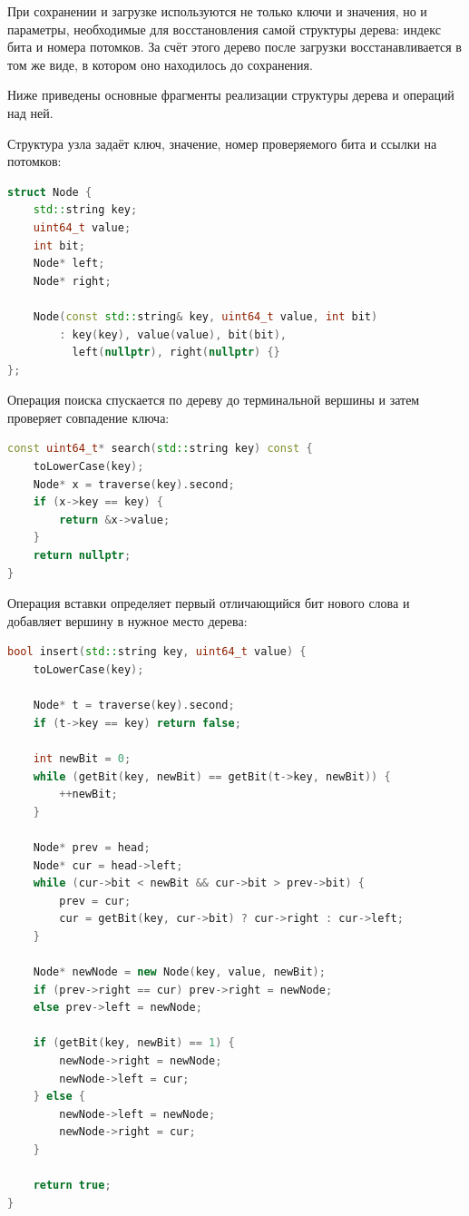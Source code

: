 При сохранении и загрузке используются не только ключи и значения, но и параметры, необходимые для восстановления самой структуры дерева: индекс бита и номера потомков. За счёт этого дерево после загрузки восстанавливается в том же виде, в котором оно находилось до сохранения.

Ниже приведены основные фрагменты реализации структуры дерева и операций над ней.

Структура узла задаёт ключ, значение, номер проверяемого бита и ссылки на потомков:

\begin{lstlisting}[language=C++]
struct Node {
    std::string key;
    uint64_t value;
    int bit;
    Node* left;
    Node* right;

    Node(const std::string& key, uint64_t value, int bit)
        : key(key), value(value), bit(bit),
          left(nullptr), right(nullptr) {}
};
\end{lstlisting}

Операция поиска спускается по дереву до терминальной вершины и затем проверяет совпадение ключа:

\begin{lstlisting}[language=C++]
const uint64_t* search(std::string key) const {
    toLowerCase(key);
    Node* x = traverse(key).second;
    if (x->key == key) {
        return &x->value;
    }
    return nullptr;
}
\end{lstlisting}

Операция вставки определяет первый отличающийся бит нового слова и добавляет вершину в нужное место дерева:

\begin{lstlisting}[language=C++]
bool insert(std::string key, uint64_t value) {
    toLowerCase(key);

    Node* t = traverse(key).second;
    if (t->key == key) return false;

    int newBit = 0;
    while (getBit(key, newBit) == getBit(t->key, newBit)) {
        ++newBit;
    }

    Node* prev = head;
    Node* cur = head->left;
    while (cur->bit < newBit && cur->bit > prev->bit) {
        prev = cur;
        cur = getBit(key, cur->bit) ? cur->right : cur->left;
    }

    Node* newNode = new Node(key, value, newBit);
    if (prev->right == cur) prev->right = newNode;
    else prev->left = newNode;

    if (getBit(key, newBit) == 1) {
        newNode->right = newNode;
        newNode->left = cur;
    } else {
        newNode->left = newNode;
        newNode->right = cur;
    }

    return true;
}
\end{lstlisting}

